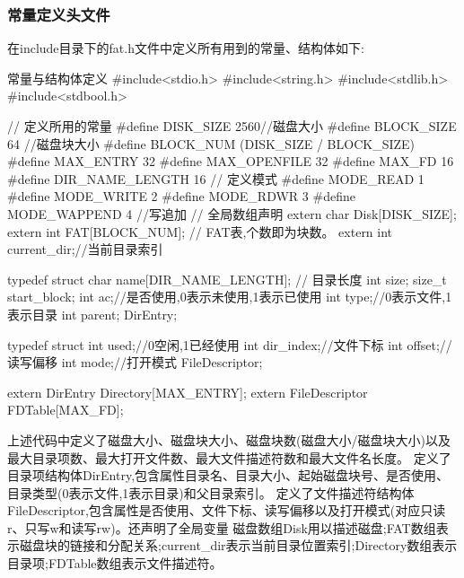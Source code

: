 \subsubsection{常量定义头文件}
在include目录下的fat.h文件中定义所有用到的常量、结构体如下:
\begin{ccode}{常量与结构体定义}
#include<stdio.h>
#include<string.h>
#include<stdlib.h>
#include<stdbool.h>

// 定义所用的常量
#define DISK_SIZE 2560//磁盘大小
#define BLOCK_SIZE 64 //磁盘块大小
#define BLOCK_NUM  (DISK_SIZE / BLOCK_SIZE)
#define MAX_ENTRY 32
#define MAX_OPENFILE 32
#define MAX_FD 16
#define DIR_NAME_LENGTH 16
// 定义模式
#define MODE_READ 1
#define MODE_WRITE 2
#define MODE_RDWR 3
#define MODE_WAPPEND 4  //写追加
// 全局数组声明
extern char Disk[DISK_SIZE];
extern int FAT[BLOCK_NUM]; // FAT表,个数即为块数。
extern int current_dir;//当前目录索引


typedef struct{
    char name[DIR_NAME_LENGTH]; // 目录长度
    int size;
    size_t start_block;
    int ac;//是否使用,0表示未使用,1表示已使用
    int type;//0表示文件,1表示目录
    int parent;
}DirEntry;

typedef struct{
    int used;//0空闲,1已经使用
    int dir_index;//文件下标
    int offset;//读写偏移
    int mode;//打开模式
}FileDescriptor;

extern DirEntry Directory[MAX_ENTRY];
extern FileDescriptor FDTable[MAX_FD]; 
\end{ccode}
上述代码中定义了磁盘大小、磁盘块大小、磁盘块数(磁盘大小/磁盘块大小)以及最大目录项数、最大打开文件数、最大文件描述符数和最大文件名长度。
定义了目录项结构体DirEntry,包含属性目录名、目录大小、起始磁盘块号、是否使用、目录类型(0表示文件,1表示目录)和父目录索引。
定义了文件描述符结构体FileDescriptor,包含属性是否使用、文件下标、读写偏移以及打开模式(对应只读r、只写w和读写rw)。还声明了全局变量
磁盘数组Disk用以描述磁盘;FAT数组表示磁盘块的链接和分配关系;current\_dir表示当前目录位置索引;Directory数组表示目录项;FDTable数组表示文件描述符。